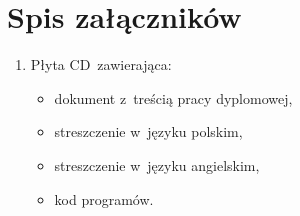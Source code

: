 \documentclass[a4paper,11pt,twoside]{report}
\theoremstyle{definition}
\begin{document}
\renewcommand{\listtablename}{Spis tabel}
\listoftables
\thispagestyle{empty}



\chapter*{Spis załączników}
\begin{enumerate}
\item Płyta CD~zawierająca:
\begin{itemize}
	\item dokument z~treścią pracy dyplomowej,
	\item streszczenie w~języku polskim,
	\item streszczenie w~języku angielskim,
	\item kod programów.
\end{itemize}
\end{enumerate}
\thispagestyle{empty}
\end{document}
